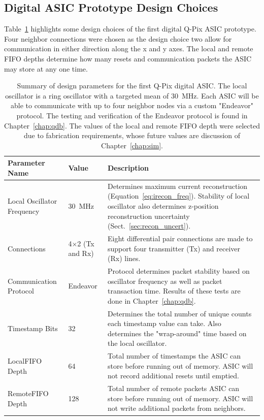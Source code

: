 \subsection{Digital ASIC Prototype Design Choices}
\label{sec:design_choices}
Table~\ref{table:digital_design_params} highlights some design choices of the first digital Q-Pix ASIC prototype.
Four neighbor connections were chosen as the design choice two allow for communication in either direction along the x and y axes.
The local and remote FIFO depths determine how many resets and communication packets the ASIC may store at any one time.

\begin{table}
\begin{center}
\begin{tabular}{||p{30mm} | p{30mm} | p{90mm}||}
 \hline
 Parameter Name & Value & Description \\ 
 \hline\hline
Local Oscillator Frequency & 30~\unit{MHz} & Determines maximum current reconstruction (Equation~\ref{eq:irecon_freq}). Stability of local oscillator also determines z-position reconstruction uncertainty (Sect.~\ref{sec:recon_uncert}). \\
 \hline
Connections & 4$\times$2 (Tx and Rx) &  Eight differential pair connections are made to support four transmitter (Tx) and receiver (Rx) lines. \\
 \hline
Communication Protocol & Endeavor & Protocol determines packet stability based on oscillator frequency as well as packet transaction time. Results of these tests are done in Chapter~\ref{chap:qdb}. \\
 \hline
Timestamp Bits & 32 & Determines the total number of unique counts each timestamp value can take. Also determines the "wrap-around" time based on the local oscillator.  \\
 \hline
Local\newline FIFO Depth & 64 & Total number of timestamps the ASIC can store before running out of memory. ASIC will not record additional resets until emptied. \\
 \hline
Remote\newline FIFO Depth & 128 & Total number of remote packets ASIC can store before running out of memory. ASIC will not write additional packets from neighbors. \\
 \hline
 \hline
\end{tabular}
\caption{Summary of design parameters for the first Q-Pix digital ASIC.
The local oscillator is a ring oscillator with a targeted mean of 30~\unit{MHz}.
Each ASIC will be able to communicate with up to four neighbor nodes via a custom "Endeavor" protocol.
The testing and verification of the Endeavor protocol is found in Chapter~\ref{chap:qdb}.
The values of the local and remote FIFO depth were selected due to fabrication requirements, whose future values are discussion of Chapter~\ref{chap:sim}.
}
\label{table:digital_design_params}
\end{center}
\end{table}

